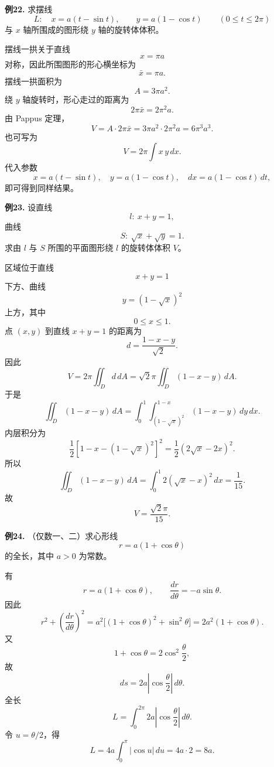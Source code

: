 \begin{problemblock}
\textbf{例22.} 求摆线
\[
L:\quad x=a(t-\sin t),\qquad y=a(1-\cos t)\qquad (0\le t\le2\pi)
\]
与 \(x\) 轴所围成的图形绕 \(y\) 轴的旋转体体积。
\end{problemblock}
\begin{solutionblock}
摆线一拱关于直线
\[
x=\pi a
\]
对称，因此所围图形的形心横坐标为
\[
\bar x=\pi a.
\]
摆线一拱面积为
\[
A=3\pi a^2.
\]
绕 \(y\) 轴旋转时，形心走过的距离为
\[
2\pi\bar x=2\pi^2a.
\]
由 Pappus 定理，
\[
V=A\cdot2\pi\bar x
=3\pi a^2\cdot2\pi^2a
=6\pi^3a^3.
\]
也可写为
\[
V=2\pi\int x\,y\,dx.
\]
代入参数
\[
x=a(t-\sin t),\quad y=a(1-\cos t),\quad dx=a(1-\cos t)\,dt,
\]
即可得到同样结果。
\end{solutionblock}

\begin{problemblock}
\textbf{例23.} 设直线
\[
l:\ x+y=1,
\]
曲线
\[
S:\ \sqrt{x}+\sqrt{y}=1.
\]
求由 \(l\) 与 \(S\) 所围的平面图形绕 \(l\) 的旋转体体积 \(V\)。
\end{problemblock}
\begin{solutionblock}
区域位于直线
\[
x+y=1
\]
下方、曲线
\[
y=(1-\sqrt{x})^2
\]
上方，其中
\[
0\le x\le1.
\]
点 \((x,y)\) 到直线 \(x+y=1\) 的距离为
\[
d=\frac{1-x-y}{\sqrt2}.
\]
因此
\[
V=2\pi\iint_D d\,dA
=\sqrt2\pi\iint_D(1-x-y)\,dA.
\]
于是
\[
\iint_D(1-x-y)\,dA
=\int_0^1\int_{(1-\sqrt{x})^2}^{1-x}(1-x-y)\,dy\,dx.
\]
内层积分为
\[
\frac12\left[1-x-(1-\sqrt{x})^2\right]^2
=\frac12(2\sqrt{x}-2x)^2.
\]
所以
\[
\iint_D(1-x-y)\,dA
=\int_0^1 2(\sqrt{x}-x)^2\,dx
=\frac1{15}.
\]
故
\[
V=\frac{\sqrt2\pi}{15}.
\]
\end{solutionblock}

\begin{problemblock}
\textbf{例24.} （仅数一、二）求心形线
\[
r=a(1+\cos\theta)
\]
的全长，其中 \(a>0\) 为常数。
\end{problemblock}
\begin{solutionblock}
有
\[
r=a(1+\cos\theta),\qquad
\frac{dr}{d\theta}=-a\sin\theta.
\]
因此
\[
r^2+\left(\frac{dr}{d\theta}\right)^2
=a^2\bigl[(1+\cos\theta)^2+\sin^2\theta\bigr]
=2a^2(1+\cos\theta).
\]
又
\[
1+\cos\theta=2\cos^2\frac{\theta}{2},
\]
故
\[
ds=2a\left|\cos\frac{\theta}{2}\right|\,d\theta.
\]
全长
\[
L=\int_0^{2\pi}2a\left|\cos\frac{\theta}{2}\right|\,d\theta.
\]
令 \(u=\theta/2\)，得
\[
L=4a\int_0^\pi|\cos u|\,du=4a\cdot2=8a.
\]
\end{solutionblock}

